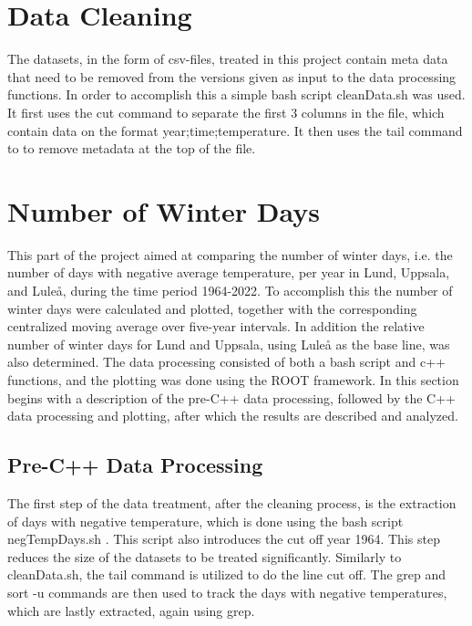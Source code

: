 \documentclass[aps,prl,groupedaddress,twocolumn]{revtex4-1}
\begin{document}
\section{Data Cleaning}

The datasets, in the form of csv-files, treated in this project contain meta data that need to be removed from the versions given as input to the data processing functions. In order to accomplish this a simple bash script cleanData.sh was used. It first uses the cut command to separate the first 3 columns in the file, which contain data on the format year;time;temperature. It then uses the tail command to to remove metadata at the top of the file.

\section{Number of Winter Days}

This part of the project aimed at comparing the number of winter days, i.e. the number of days with negative average temperature, per year in Lund, Uppsala, and Luleå, during the time period 1964-2022. To accomplish this the number of winter days were calculated and plotted, together with the corresponding centralized moving average over five-year intervals. In addition the relative number of winter days for Lund and Uppsala, using Luleå as the base line, was also determined. The data processing consisted of both a bash script and c++ functions, and the plotting was done using the ROOT framework. In this section begins with a description of the pre-C++ data processing, followed by the C++ data processing and plotting, after which the results are described and analyzed.  

\subsection{Pre-C++ Data Processing}

The first step of the data treatment, after the cleaning process, is the extraction of days with negative temperature, which is done using the bash script negTempDays.sh . This script also introduces the cut off year 1964. This step reduces the size of the datasets to be treated significantly. Similarly to cleanData.sh, the tail command is utilized to do the line cut off. The grep and sort -u commands are then used to track the days with negative temperatures, which are lastly extracted, again using grep.
\end{document}
